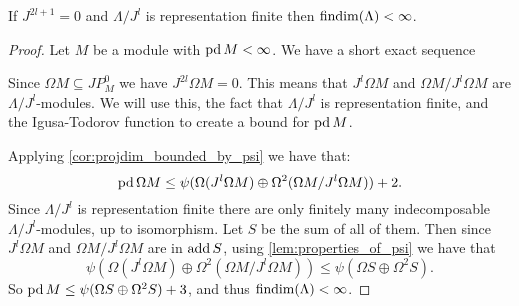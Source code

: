 \begin{theorem}\cite{Wang94}
	If $J^{2l+1} = 0$ and $\Lambda / J^l$ is representation finite then $\operatorname{findim}(\Lambda) < \infty$.
	\begin{proof}
		Let $M$ be a module with $\operatorname{pd} M < \infty$. We have a short exact sequence 
		\begin{center}
		\end{center}
		Since $\Omega M \subseteq JP^0_M$ we have $J^{2l}\Omega M = 0$. This means that $J^l\Omega M$ and $\Omega M / J^l\Omega M$ are $\Lambda / J^l$-modules. We will use this, the fact that $\Lambda / J^l$ is representation finite, and the Igusa-Todorov function to create a bound for $\operatorname{pd} M$.
		
		Applying \cref{cor:projdim_bounded_by_psi} we have that:
		$$ \operatorname{pd} \Omega M \leq \psi(\Omega (J^l\Omega M)\oplus\Omega^2(\Omega M / J^l\Omega M)) + 2.$$ 
		Since $\Lambda / J^l$ is representation finite there are only finitely many indecomposable $\Lambda / J^l$-modules, up to isomorphism. Let $S$ be the sum of all of them. Then since $J^l\Omega M$ and $\Omega M / J^l\Omega M$ are in $\operatorname{add} S$, using \cref{lem:properties_of_psi} we have that 
		$$\psi(\Omega (J^l\Omega M)\oplus\Omega^2(\Omega M / J^l\Omega M)) \leq \psi(\Omega S \oplus \Omega^2 S).$$
		So $\operatorname{pd} M \leq \psi(\Omega S \oplus \Omega^2 S) + 3$, and thus $\operatorname{findim}(\Lambda) < \infty$.
	\end{proof}
\end{theorem}
